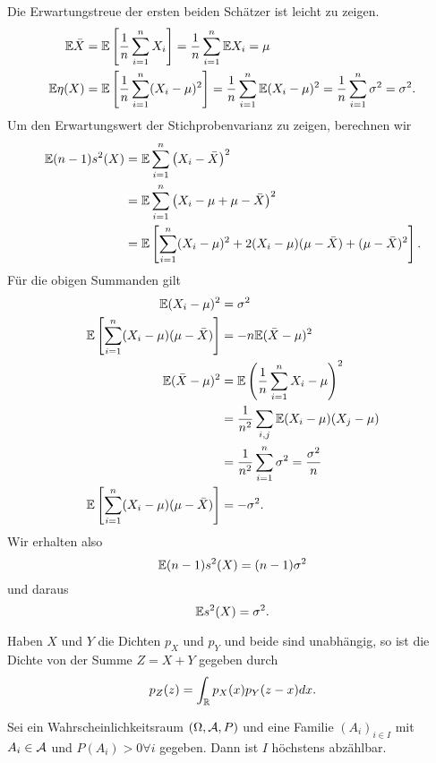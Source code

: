 \solution
Die Erwartungstreue der ersten beiden Schätzer ist leicht zu zeigen. 
\begin{align*}
    \mathbb{E} \bar X &= \mathbb{E} \left[ \frac{1}{n} \sum_{i=1}^{n} X_i \right] 
    = \frac{1}{n} \sum_{i=1}^{n} \mathbb{E} X_i = \mu \\
    \mathbb{E} \eta(X) &= \mathbb{E} \left[ \frac{1}{n} \sum_{i=1}^{n} (X_i -\mu)^2 \right] 
    = \frac{1}{n} \sum_{i=1}^{n} \mathbb{E} (X_i-\mu)^2 = \frac{1}{n} \sum_{i=1}^{n} \sigma^2 = \sigma^2.
\end{align*}
Um den Erwartungswert der Stichprobenvarianz zu zeigen, berechnen wir
\begin{align*}
    \mathbb{E} (n-1) s^2(X) &= \mathbb{E} \sum_{i=1}^{n} \left( X_i - \bar X \right)^2 \\
    &= \mathbb{E} \sum_{i=1}^{n} \left( X_i - \mu + \mu - \bar X \right)^2 \\
    &= \mathbb{E} \left[ \sum_{i=1}^{n} (X_i-\mu)^2 + 2 (X_i-\mu)(\mu-\bar X) + (\mu -\bar X)^2 \right].
\end{align*}
Für die obigen Summanden gilt
\begin{align*}
    \mathbb{E} (X_i-\mu)^2 &= \sigma^2 \\
    \mathbb{E} \left[ \sum_{i=1}^{n} (X_i-\mu)(\mu-\bar X) \right] &= -n \mathbb{E} (\bar X-\mu)^2 \\ 
    \mathbb{E} (\bar X-\mu)^2 &= \mathbb{E} \left( \frac{1}{n} \sum_{i=1}^{n} X_i-\mu \right)^2 \\
    &= \frac{1}{n^2} \sum_{i,j}^{} \mathbb{E} (X_i-\mu)(X_j-\mu) \\
    &= \frac{1}{n^2} \sum_{i=1}^{n} \sigma^2 = \frac{\sigma^2}{n} \\
    \mathbb{E} \left[ \sum_{i=1}^{n} (X_i-\mu)(\mu-\bar X) \right] &= -\sigma^2.
\end{align*}
Wir erhalten also 
\begin{equation*}
    \mathbb{E} (n-1) s^2(X) = (n-1) \sigma^2
\end{equation*}
und daraus
\begin{equation*}
    \mathbb{E} s^2(X) = \sigma^2. 
\end{equation*}



 Haben $X$ und $Y$ die Dichten $p_X$ und $p_Y$ und beide
sind unabhängig, so ist die Dichte von der Summe $Z=X+Y$ gegeben durch
\begin{equation*}
    p_Z(z) = \int_{\mathbb{R}}^{} p_X(x)p_Y(z-x) dx.
\end{equation*}%


 Sei ein Wahrscheinlichkeitsraum
$(\Omega, \mathcal A, P)$ und eine Familie $(A_i)_{i\in I}$ mit $A_i \in \mathcal A$ und
$P(A_i)>0 \forall i$ gegeben. Dann ist $I$ höchstens abzählbar. 

